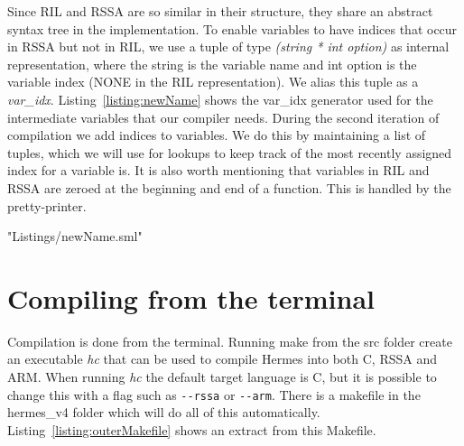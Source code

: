 \label{chapt - implementation}
Since RIL and RSSA are so similar in their structure, they share an abstract syntax tree in the implementation.
To enable variables to have indices that occur in RSSA but not in RIL, we use a tuple of type \emph{(string * int option)} as internal representation, where the string is the variable name and int option is the variable index (NONE in the RIL representation).
We alias this tuple as a \emph{var\_idx}.
Listing~\ref{listing:newName} shows the var\_idx generator used for the intermediate variables that our compiler needs.
During the second iteration of compilation we add indices to variables.
We do this by maintaining a list of tuples, which we will use for lookups to keep track of the most recently assigned index for a variable is.
It is also worth mentioning that variables in RIL and RSSA are zeroed at the beginning and end of a function. This is handled by the pretty-printer.

 {"Listings/newName.sml"}

\section{Compiling from the terminal}
Compilation is done from the terminal.
Running make from the src folder create an executable \emph{hc} that can be used to compile Hermes into both C, RSSA and ARM.
When running \emph{hc} the default target language is C, but it is possible to change this with a flag such as \lstinline{--rssa} or \lstinline{--arm}.
There is a makefile in the hermes\_v4 folder which will do all of this automatically. Listing~\ref{listing:outerMakefile} shows an extract from this Makefile.


